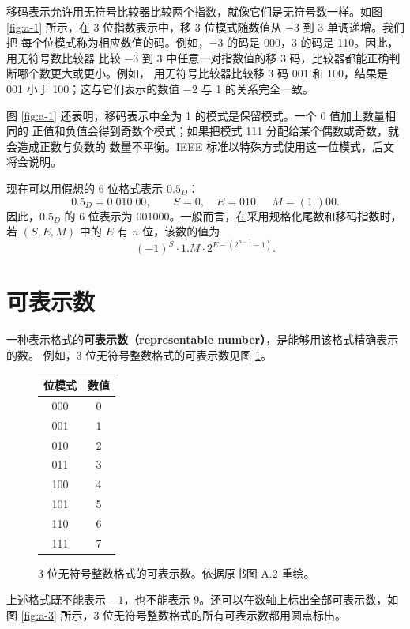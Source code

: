移码表示允许用无符号比较器比较两个指数，就像它们是无符号数一样。如图
\ref{fig:a-1} 所示，在 3 位指数表示中，移 3 位模式随数值从 $-3$ 到 3 单调递增。我们把
每个位模式称为相应数值的码。例如，$-3$ 的码是 000，3 的码是 110。因此，用无符号数比较器
比较 $-3$ 到 3 中任意一对指数值的移 3 码，比较器都能正确判断哪个数更大或更小。例如，
用无符号比较器比较移 3 码 001 和 100，结果是 001 小于 100；这与它们表示的数值 $-2$ 与
1 的关系完全一致。

图 \ref{fig:a-1} 还表明，移码表示中全为 1 的模式是保留模式。一个 0 值加上数量相同的
正值和负值会得到奇数个模式；如果把模式 111 分配给某个偶数或奇数，就会造成正数与负数的
数量不平衡。IEEE 标准以特殊方式使用这一位模式，后文将会说明。

现在可以用假想的 6 位格式表示 $0.5_D$：
\[
  0.5_D=0\;010\;00,\qquad S=0,\quad E=010,\quad M=(1.)00.
\]
因此，$0.5_D$ 的 6 位表示为 001000。一般而言，在采用规格化尾数和移码指数时，若
$(S,E,M)$ 中的 $E$ 有 $n$ 位，该数的值为
\[
  (-1)^S\cdot1.M\cdot2^{E-(2^{n-1}-1)}.
\]

\section{可表示数}
\label{sec:appa-representable}

一种表示格式的\textbf{可表示数（representable number）}，是能够用该格式精确表示的数。
例如，3 位无符号整数格式的可表示数见图 \ref{fig:a-2}。

\begin{figure}[htbp]
  \centering
  \begin{minipage}{0.28\linewidth}
    \centering
    \small
    \begin{tabular}{cc}
      \hline
      位模式 & 数值 \\
      \hline
      000&0\\001&1\\010&2\\011&3\\100&4\\101&5\\110&6\\111&7\\
      \hline
    \end{tabular}
  \end{minipage}
  \caption{3 位无符号整数格式的可表示数。依据原书图 A.2 重绘。}
  \label{fig:a-2}
\end{figure}

上述格式既不能表示 $-1$，也不能表示 9。还可以在数轴上标出全部可表示数，如图
\ref{fig:a-3} 所示，3 位无符号整数格式的所有可表示数都用圆点标出。

